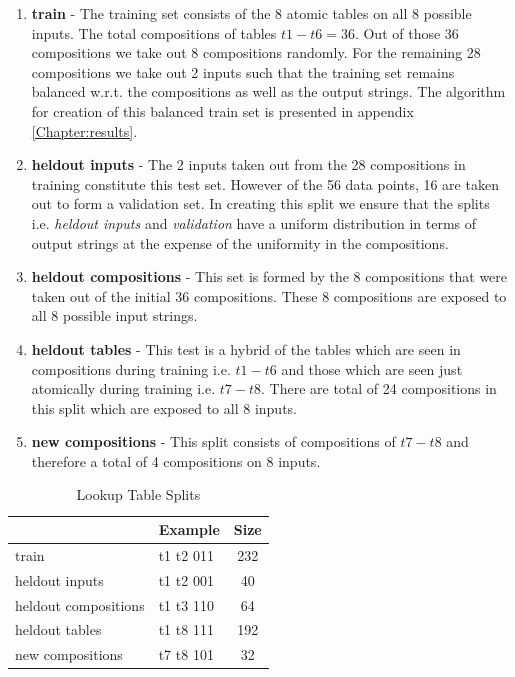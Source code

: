 \begin{enumerate}
	\item \textbf{train} - The training set consists of the 8 atomic tables on all 8 possible inputs. The total compositions of tables $t1 - t6 = 36$. Out of those 36 compositions we take out 8 compositions randomly. For the remaining 28 compositions we take out 2 inputs such that the training set remains balanced w.r.t. the compositions as well as the output strings. The algorithm for creation of this balanced train set is presented in appendix \ref{Chapter:results}.
	\item \textbf{heldout inputs} - The 2 inputs taken out from the 28 compositions in training constitute this test set. However of the 56 data points, 16 are taken out to form a validation set. In creating this split we ensure that the splits i.e. \textit{heldout inputs} and \textit{validation} have a uniform distribution in terms of output strings at the expense of the uniformity in the compositions.
	\item \textbf{heldout compositions} - This set is formed by the 8 compositions that were taken out of the initial 36 compositions. These 8 compositions are exposed to all 8 possible input strings.
	\item \textbf{heldout tables} - This test is a hybrid of the tables which are seen in compositions during training i.e. $t1 - t6$ and those which are seen just atomically during training i.e. $t7 - t8$. There are total of 24 compositions in this split which are exposed to all 8 inputs.
	\item \textbf{new compositions} - This split consists of compositions of $t7 - t8$ and therefore a total of 4 compositions on 8 inputs.
\end{enumerate}


\begin{table}[ht]
	\centering
	\begin{tabular}{l|lc}
		& Example & Size\\
		\hline
		train & t1 t2 011 & 232 \\
		heldout inputs & t1 t2 001 & 40 \\
		heldout compositions & t1 t3 110 & 64 \\
		heldout tables & t1 t8 111 & 192 \\
		new compositions & t7 t8 101 & 32 \\
	\end{tabular}
	\caption{Lookup Table Splits}
	\label{lt:stats}
\end{table}


